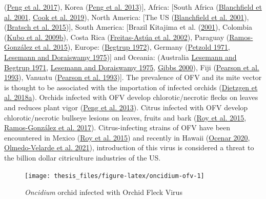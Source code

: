 \documentclass{ufdissertation}[overrideChapters] %
\begin{document}
{(\protect\hyperlink{ref-Peng2017}{Peng et al. 2017}), Korea (\protect\hyperlink{ref-Peng2013}{Peng et al. 2013}){]}, Africa: {[}South Africa (\protect\hyperlink{ref-Blanchfield2001}{Blanchfield et al. 2001}, \protect\hyperlink{ref-Cook2019}{Cook et al. 2019}), North America: {[}The US (\protect\hyperlink{ref-Blanchfield2001}{Blanchfield et al. 2001}), (\protect\hyperlink{ref-Bratsch2015}{Bratsch et al. 2015}){]}, South America: {[}Brazil Kitajima et al. (\protect\hyperlink{ref-Kitajima2001}{2001}), Colombia (\protect\hyperlink{ref-Kubo2009}{Kubo et al. 2009b}), Costa Rica (\protect\hyperlink{ref-FreitasAstua2002}{Freitas-Astúa et al. 2002}), Paraguay (\protect\hyperlink{ref-RamosGonzalez2015}{Ramos-González et al. 2015}), Europe: (\protect\hyperlink{ref-Begtrup1972}{Begtrup 1972}), Germany (\protect\hyperlink{ref-Petzold1971}{Petzold 1971}, \protect\hyperlink{ref-Lesemann1975}{Lesemann and Doraiswamy 1975}){]} and Oceania: (Australia \protect\hyperlink{ref-Lesemann1971}{Lesemann and Begtrup 1971}, \protect\hyperlink{ref-Lesemann1975}{Lesemann and Doraiswamy 1975}, \protect\hyperlink{ref-Gibbs2000}{Gibbs 2000}), Fiji (\protect\hyperlink{ref-Pearson1993}{Pearson et al. 1993}), Vanuatu (\protect\hyperlink{ref-Pearson1993}{Pearson et al. 1993}){]}. The prevalence of OFV and its mite vector is thought to be associated with the importation of infected orchids (\protect\hyperlink{ref-Dietzgen2018}{Dietzgen et al. 2018a}). Orchids infected with OFV develop chlorotic/necrotic flecks on leaves and reduces plant vigor (\protect\hyperlink{ref-Peng2013}{Peng et al. 2013}). Citrus infected with OFV develop chlorotic/necrotic bullseye lesions on leaves, fruits and bark (\protect\hyperlink{ref-Roy2015}{Roy et al. 2015}, \protect\hyperlink{ref-RamosGonzalez2017}{Ramos-González et al. 2017}). Citrus-infecting strains of OFV have been encountered in Mexico (\protect\hyperlink{ref-Roy2015}{Roy et al. 2015}) and recently in Hawaii (\protect\hyperlink{ref-Ocenar2020}{Ocenar 2020}, \protect\hyperlink{ref-Velarde2021}{Olmedo-Velarde et al. 2021}), introduction of this virus is considered a threat to the billion dollar citriculture industries of the US.
\begin{figure}

{\centering \texttt{[image: thesis\_files/figure-latex/oncidium-ofv-1]} 

}

\caption[\textit{Oncidium} orchid infected with Orchid Fleck Virus]{\textit{Oncidium} orchid infected with Orchid Fleck Virus}\label{fig:oncidium-ofv}
\end{figure}
\hypertarget{survey-and-phenology-of-natural-populations-of-the-invasive-mite-phyllocoptes-fructiphilus-in-northern-florida}{%
}}
\end{document}
